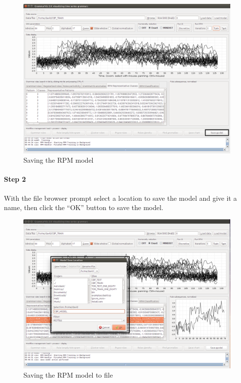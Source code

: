 \documentclass[letterpaper, 12pt]{article}
\begin{document}
\begin{figure}[H]
  \includegraphics[width=\textwidth]{TSAT-save-model-step-1}
  \caption{Saving the RPM model}
  \label{fig:TSAT-save-model-step-1}
\end{figure}

\newpage
\paragraph{Step 2}
With the file browser prompt select a location to save the model and give it a name, then click the ``OK'' button to save the model.

\begin{figure}[H]
  \includegraphics[width=\textwidth]{TSAT-save-model-step-2}
  \caption{Saving the RPM model to file}
  \label{fig:TSAT-save-model-step-2}
\end{figure}
\end{document}
